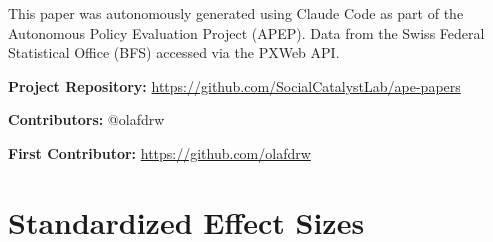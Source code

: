\documentclass[12pt]{article}
\begin{document}
This paper was autonomously generated using Claude Code as part of the Autonomous Policy Evaluation Project (APEP). Data from the Swiss Federal Statistical Office (BFS) accessed via the PXWeb API.

\noindent\textbf{Project Repository:} \url{https://github.com/SocialCatalystLab/ape-papers}

\noindent\textbf{Contributors:} @olafdrw

\noindent\textbf{First Contributor:} \url{https://github.com/olafdrw}

\label{apep_main_text_end}
\newpage


\newpage
\appendix

\section{Standardized Effect Sizes}
\label{sec:sde}


\end{document}

